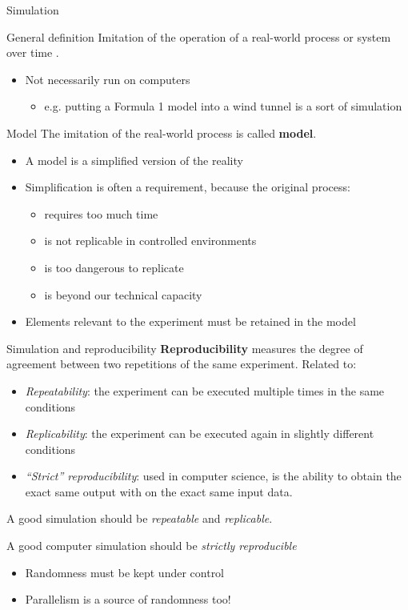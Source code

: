 \documentclass[presentation]{beamer}
\begin{document}
\begin{frame}{Simulation}
	\begin{block}{General definition}
		Imitation of the operation of a real-world process or system over time \cite{des-book}.
		\begin{itemize}
			\item Not necessarily run on computers
			\begin{itemize}
				\item e.g. putting a Formula 1 model into a wind tunnel is a sort of simulation
			\end{itemize}
		\end{itemize}
	\end{block}
	\begin{block}{Model}
		The imitation of the real-world process is called \textbf{model}.
		\begin{itemize}
			\item A model is a simplified version of the reality
			\item Simplification is often a requirement, because the original process:
			\begin{itemize}
				\item requires too much time
				\item is not replicable in controlled environments
				\item is too dangerous to replicate
				\item is beyond our technical capacity
			\end{itemize}
			\item Elements relevant to the experiment must be retained in the model
		\end{itemize}
	\end{block}
\end{frame}

\begin{frame}{Simulation and reproducibility}
    \textbf{Reproducibility} measures the degree of agreement between two repetitions of the same experiment.
    Related to:
    \begin{itemize}
        \item \textit{Repeatability}: the experiment can be executed multiple times in the same conditions
        \item \textit{Replicability}: the experiment can be executed again in slightly different conditions
        \item \textit{``Strict'' reproducibility}: used in computer science, is the ability to obtain the exact same output with on the exact same input data.
    \end{itemize}

    A good simulation should be \textit{repeatable} and \textit{replicable}.

    A good computer simulation should be \textit{strictly reproducible}
    \begin{itemize}
        \item Randomness must be kept under control
        \item Parallelism is a source of randomness too!
    \end{itemize}
\end{frame}
\end{document}
